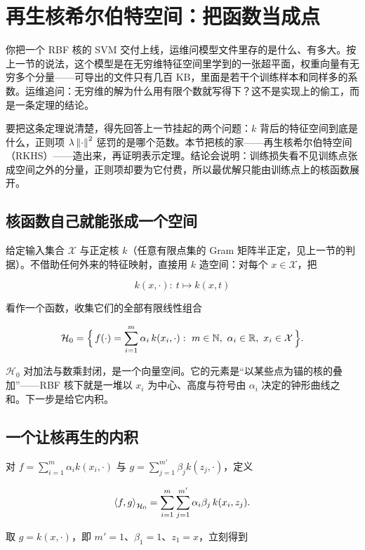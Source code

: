 \section{再生核希尔伯特空间：把函数当成点}
\label{sec:13-Machine-Learning/09-Kernel-Methods-and-Gaussian-Processes/03}

你把一个 RBF 核的 SVM 交付上线，运维问模型文件里存的是什么、有多大。按上一节的说法，这个模型是在无穷维特征空间里学到的一张超平面，权重向量有无穷多个分量——可导出的文件只有几百 KB，里面是若干个训练样本和同样多的系数。运维追问：无穷维的解为什么用有限个数就写得下？这不是实现上的偷工，而是一条定理的结论。

要把这条定理说清楚，得先回答上一节挂起的两个问题：\(k\) 背后的特征空间到底是什么，正则项 \(\lambda\left\lVert\cdot\right\rVert^2\) 惩罚的是哪个范数。本节把核的家——再生核希尔伯特空间（RKHS）——造出来，再证明表示定理。结论会说明：训练损失看不见训练点张成空间之外的分量，正则项却要为它付费，所以最优解只能由训练点上的核函数展开。

\subsection{核函数自己就能张成一个空间}

给定输入集合 \(\mathcal{X}\) 与正定核 \(k\)（任意有限点集的 Gram 矩阵半正定，见上一节的判据）。不借助任何外来的特征映射，直接用 \(k\) 造空间：对每个 \(x\in\mathcal{X}\)，把

\[
k(x,\cdot):\ t\mapsto k(x,t)
\]

看作一个函数，收集它们的全部有限线性组合

\[
\mathcal{H}_0
=\Bigl\{\,f(\cdot)=\sum_{i=1}^{m}\alpha_i\,k(x_i,\cdot):
\ m\in\mathbb{N},\ \alpha_i\in\mathbb{R},\ x_i\in\mathcal{X}\,\Bigr\}.
\]

\(\mathcal{H}_0\) 对加法与数乘封闭，是一个向量空间。它的元素是``以某些点为锚的核的叠加''——RBF 核下就是一堆以 \(x_i\) 为中心、高度与符号由 \(\alpha_i\) 决定的钟形曲线之和。下一步是给它内积。

\subsection{一个让核再生的内积}

对 \(f=\sum_{i=1}^{m}\alpha_i k(x_i,\cdot)\) 与 \(g=\sum_{j=1}^{m'}\beta_j k(z_j,\cdot)\)，定义

\[
\left\langle f,g\right\rangle_{\mathcal{H}_0}
=\sum_{i=1}^{m}\sum_{j=1}^{m'}\alpha_i\beta_j\,k(x_i,z_j).
\]

取 \(g=k(x,\cdot)\)，即 \(m'=1\)、\(\beta_1=1\)、\(z_1=x\)，立刻得到

